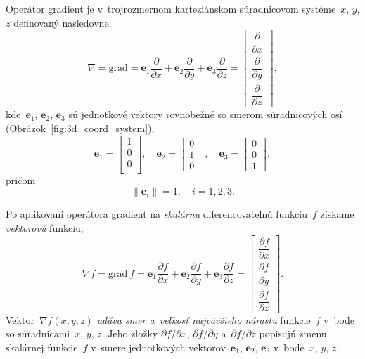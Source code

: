 \documentclass[a4paper,12pt]{book}
\newcommand{\grad}{\mathrm{grad}}
\let\vec\mathbf
\begin{document}
Operátor gradient je v~trojrozmernom karteziánskom súradnicovom systéme~$x$, 
$y$, $z$ definovaný nasledovne,
%
\begin{equation}
\label{eq:gradient}
\nabla = \grad = \vec e_1 \frac{\partial}{\partial x} + \vec e_2
\frac{\partial}{\partial y} + \vec e_3 \frac{\partial}{\partial z} =
\begin{bmatrix}
\dfrac{\partial}{\partial x} \\[2ex]
\dfrac{\partial}{\partial y} \\[2ex]
\dfrac{\partial}{\partial z}
\end{bmatrix}
{,}
\end{equation}
%
kde~$\vec e_1$, $\vec e_2$, $\vec e_3$ sú jednotkové vektory
rovnobežné so smerom súradnicových osí (Obrázok~\ref{fig:3d_coord_system}),
%
\begin{equation}
\label{eq:unit_vectors}
\vec e_1 =
\begin{bmatrix}
1\\
0\\
0\\
\end{bmatrix}
{,} \quad
%
\vec e_2 =
\begin{bmatrix}
0\\
1\\
0
\end{bmatrix}
%
{,}\quad
%
\vec e_3 =
\begin{bmatrix}
0\\
0\\
1
\end{bmatrix}
{,}
\end{equation}
%
pričom
%
\begin{equation}
\label{eq:unit_vectors_unit_length}
\| \vec e_i \| = 1{,} \quad i = 1, 2,3{.}
\end{equation}

Po aplikovaní operátora gradient na \emph{skalárnu} diferencovateľnú 
funkciu~$f$ získame \emph{vektorovú} funkciu,
%
\begin{equation}
\nabla f = \grad \ f = \vec e_1 \frac{\partial f}{\partial x} + \vec e_2 
\frac{\partial
f}{\partial y} + \vec e_3 \frac{\partial f}{\partial z} =
\begin{bmatrix}
\dfrac{\partial f}{\partial x} \\[2ex]
\dfrac{\partial f}{\partial y} \\[2ex]
\dfrac{\partial f}{\partial z}
\end{bmatrix}
{.}
\end{equation}
%
Vektor~$\nabla f(x, y, z)$ \emph{udáva smer a~veľkosť najväčšieho nárastu} 
funkcie~$f$ v~bode so súradnicami~$x$, $y$, $z$.  Jeho zložky $\partial 
f \slash \partial x$, $\partial f \slash \partial y$ a~$\partial f \slash 
\partial z$ popisujú zmenu skalárnej funkcie~$f$ v~smere jednotkových 
vektorov~$\vec e_1$, $\vec e_2$, $\vec e_3$ v~bode~$x$, $y$, $z$.
\end{document}
